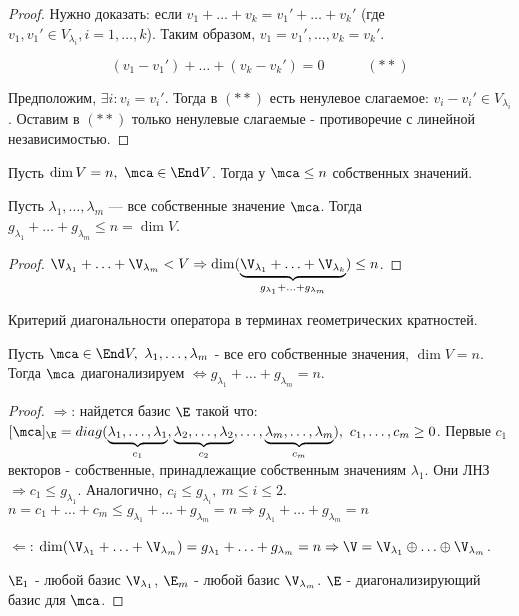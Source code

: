 \documentclass[main]{subfiles}
\begin{document}
\begin{proof}
    Нужно доказать: если $v_1 + \ldots + v_k = v_1' + \ldots + v_k'$
    (где $v_1, v_1' \in V_{\lambda_i}, i = 1, \ldots, k$). 
    Таким образом, $v_1 = v_1', \ldots, v_k = v_k'$. 
    
        \[(v_1 - v_1') + \ldots + (v_k - v_k') = 0 \quad \quad \quad (**)\]
    
    Предположим, $\exists i : v_i = v_i'$. Тогда в $(**)$  есть ненулевое слагаемое:
    $v_i - v_i' \in V_{\lambda_i}$. Оставим в $(**)$ только ненулевые 
    слагаемые  - противоречие с линейной независимостью.
\end{proof}

\begin{corollary}
    Пусть $\dim V = n,\ \mca \in \End V$. Тогда у  $\mca \le n$ собственных значений.
\end{corollary}

\begin{corollary}
    Пусть $\lambda_1, \ldots, \lambda_m$ — все собственные значение $\mca$. 
    Тогда $g_{\lambda_1} + \ldots + g_{\lambda_m} \le n = \dim V$.
\end{corollary}

\begin{proof}
    $\V_{\lambda_1} + \ldots + \V_{\lambda_m} < V 
    \Rightarrow \dim (\underbrace{\V_{\lambda_1} + \ldots + \V_{\lambda_k}}_{g_{\lambda_1} + \ldots + g_{\lambda_m}}) \leq n$.
\end{proof}

\begin{proposition}
    Критерий диагональности оператора в терминах геометрических кратностей.

    Пусть $\mca \in \End V,\ \lambda_1, \ldots, \lambda_m$ - все его собственные значения, 
    $\dim V = n$. Тогда $\mca$  диагонализируем $\Leftrightarrow
    g_{\lambda_1} + \ldots +  g_{\lambda_m} = n$.
\end{proposition}

\begin{proof}
    $\Rightarrow$: найдется базис $\E$ такой что: 
    $[\mca]_\E = diag(\underbrace{\lambda_1, \ldots, \lambda_1}_{c_1},
    \underbrace{\lambda_2, \ldots, \lambda_2}_{c_2}, \ldots,
    \underbrace{\lambda_m, \ldots, \lambda_m}_{c_m}), \  c_1, \ldots, c_m \geq 0$.
    Первые $c_1$  векторов - собственные, принадлежащие собственным значениям 
    $\lambda_1$. Они ЛНЗ $\Rightarrow c_1 \leq g_{\lambda_1}$.
    Аналогично, $c_i \leq g_{\lambda_i},\ m \leq i \leq 2$.
    $n = c_1 + \ldots + c_m \leq g_{\lambda_1} + \ldots + g_{\lambda_m} = n
    \Rightarrow g_{\lambda_1} + \ldots + g_{\lambda_m} = n$

    $\Leftarrow$: $\dim (\V_{\lambda_1} + \ldots + \V_{\lambda_m}) =
    g_{\lambda_1} + \ldots + g_{\lambda_m} = n \Rightarrow
    \V = \V_{\lambda_1} \oplus \ldots \oplus  \V_{\lambda_m}$.

    $\E_1$ - любой базис $\V_{\lambda_1}$,  
    $\E_m$ - любой базис $\V_{\lambda_m}$. 
    $\E$ - диагонализирующий базис для $\mca$.
\end{proof}
\end{document}
